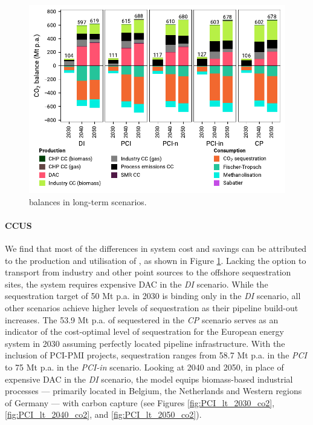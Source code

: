\documentclass[final,5p,times,twocolumn,sort&compress]{elsarticle}
\begin{document}
\begin{figure}[htbp]
  \centering
  \includegraphics[width=\linewidth]{balances_overview_co2 stored}
  \caption{ balances in long-term scenarios.}
  \label{fig:balances_overview_co2_stored}
\end{figure}

\paragraph{CCUS}
\label{sec:ccus}
We find that most of the differences in system cost and savings can be attributed to the production and utilisation of , as shown in Figure \ref{fig:balances_overview_co2_stored}. Lacking the option to transport  from industry and other point sources to the offshore sequestration sites, the system requires expensive DAC in the \textit{DI} scenario. While the sequestration target of 50 Mt p.a. in 2030 is binding only in the \textit{DI} scenario, all other scenarios achieve higher levels of  sequestration as their  pipeline build-out increases. 
The 53.9 Mt p.a. of  sequestered in the \textit{CP} scenario serves as an indicator of the cost-optimal level of sequestration for the European energy system in 2030 assuming perfectly located pipeline infrastructure. With the inclusion of PCI-PMI projects,  sequestration ranges from 58.7 Mt p.a. in the \textit{PCI} to 75 Mt p.a. in the \textit{PCI-in} scenario. 
Looking at 2040 and 2050, in place of expensive DAC in the \textit{DI} scenario, the model equips biomass-based industrial processes --- primarily located in Belgium, the Netherlands and Western regions of Germany --- with carbon capture (see Figures \ref{fig:PCI_lt_2030_co2}, \ref{fig:PCI_lt_2040_co2}, and \ref{fig:PCI_lt_2050_co2}). 
\end{document}
